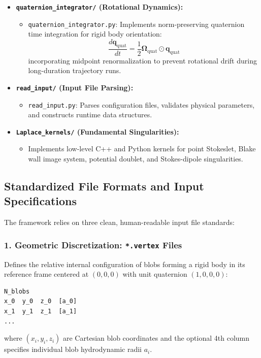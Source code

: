 \documentclass[11pt,a4paper]{article}
\begin{document}
\begin{itemize}
\begin{itemize}
    \end{itemize}
    \item \textbf{\texttt{quaternion\_integrator/} (Rotational Dynamics):}
    \begin{itemize}
        \item \texttt{quaternion\_integrator.py}: Implements norm-preserving quaternion time integration for rigid body orientation:
        \begin{equation}
            \frac{d\mathbf{q}_{\text{quat}}}{dt} = \frac{1}{2} \boldsymbol{\Omega}_{\text{quat}} \odot \mathbf{q}_{\text{quat}}
        \end{equation}
        incorporating midpoint renormalization to prevent rotational drift during long-duration trajectory runs.
    \end{itemize}
    \item \textbf{\texttt{read\_input/} (Input File Parsing):}
    \begin{itemize}
        \item \texttt{read\_input.py}: Parses configuration files, validates physical parameters, and constructs runtime data structures.
    \end{itemize}
    \item \textbf{\texttt{Laplace\_kernels/} (Fundamental Singularities):}
    \begin{itemize}
        \item Implements low-level C++ and Python kernels for point Stokeslet, Blake wall image system, potential doublet, and Stokes-dipole singularities.
    \end{itemize}
\end{itemize}

\subsection{Standardized File Formats and Input Specifications}
The framework relies on three clean, human-readable input file standards:

\subsubsection{1. Geometric Discretization: \texttt{*.vertex} Files}
Defines the relative internal configuration of blobs forming a rigid body in its reference frame centered at $(0, 0, 0)$ with unit quaternion $(1, 0, 0, 0)$:
\begin{verbatim}
N_blobs
x_0  y_0  z_0  [a_0]
x_1  y_1  z_1  [a_1]
...
\end{verbatim}
where $(x_i, y_i, z_i)$ are Cartesian blob coordinates and the optional 4th column specifies individual blob hydrodynamic radii $a_i$.
\end{document}
